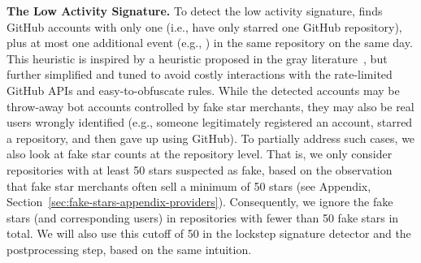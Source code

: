 \textbf{The Low Activity Signature.}
To detect the low activity signature, \SystemName finds GitHub accounts with only one  (i.e., have only starred one GitHub repository), plus at most one additional event (e.g., ) in the same repository on the same day.
This heuristic is inspired by a heuristic proposed in the gray literature~\cite{dagster}, but further simplified and tuned to avoid costly interactions with the rate-limited GitHub APIs and easy-to-obfuscate rules. %
While the detected accounts may be throw-away bot accounts controlled by fake star merchants, they may also be real users wrongly identified (e.g., someone legitimately registered an account, starred a repository, and then gave up using GitHub).
To partially address such cases, we also look at fake star counts at the repository level. 
That is, we only consider repositories with at least 50 stars suspected as fake, based on the observation that fake star merchants often sell a minimum of 50 stars (see Appendix, Section~\ref{sec:fake-stars-appendix-providers}).
Consequently, we ignore the fake stars (and corresponding users) in repositories with fewer than 50 fake stars in total.
We will also use this cutoff of 50 in the lockstep signature detector and the postprocessing step, based on the same intuition.

